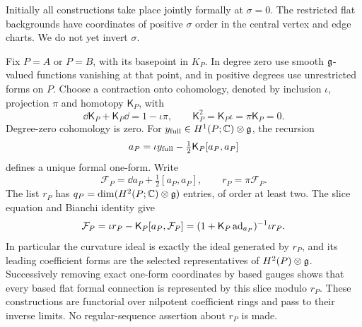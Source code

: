 Initially all constructions take place jointly formally at
$\sigma=0$.  The restricted flat backgrounds have coordinates of positive
$\sigma$ order in the central vertex and edge charts.  We do not yet
invert $\sigma$.

Fix $P=A$ or $P=B$, with its basepoint in $K_P$.  In degree zero use smooth
$\mathfrak{g}$-valued functions vanishing at that point, and in positive degrees
use unrestricted forms on $P$.  Choose a contraction onto cohomology,
denoted by inclusion $\iota$, projection $\pi$ and homotopy $\mathsf K_P$, with
\[
 \dd\mathsf K_P+\mathsf K_P\dd=1-\iota\pi,
 \qquad \mathsf K_P^2=\mathsf K_P\iota=\pi\mathsf K_P=0.
\]
Degree-zero cohomology is zero.  For
$y_{\rm full}\in H^1(P;\mathbb C)\otimes\mathfrak{g}$, the recursion
\[
 a_P=\iota y_{\rm full}-\tfrac12\mathsf K_P[a_P,a_P]
\]
defines a unique formal one-form.  Write
\[
 \mathcal F_P=\dd a_P+\tfrac12[a_P,a_P],\qquad r_P=\pi\mathcal F_P.
\]
The list $r_P$ has $q_P=\dim(H^2(P;\mathbb C)\otimes\mathfrak{g})$ entries, of
order at least two.  The slice equation and Bianchi identity give
\begin{equation}
\label{eq:vertex-residual-curvature}
 \mathcal F_P=\iota r_P-\mathsf K_P[a_P,\mathcal F_P]
       =(1+\mathsf K_P\operatorname{ad}_{a_P})^{-1}\iota r_P.
\end{equation}
In particular the curvature ideal is exactly the ideal generated by
$r_P$, and its leading coefficient forms are the selected representatives
of $H^2(P)\otimes\mathfrak{g}$.  Successively removing exact one-form coordinates
by based gauges shows that every based flat formal connection is
represented by this slice modulo $r_P$.  These constructions are
functorial over nilpotent coefficient rings and pass to their inverse
limits.  No regular-sequence assertion about $r_P$ is made.

